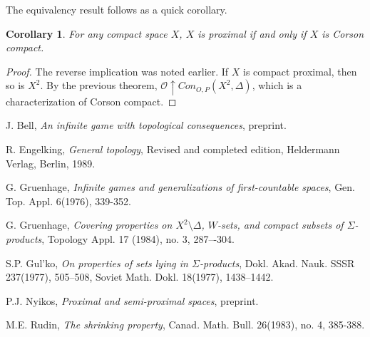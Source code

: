 \documentclass{amsart}
\newtheorem{cor}[thm]{Corollary}
\theoremstyle{definition}
\theoremstyle{remark}
\newcommand{\<}{\langle}
\renewcommand{\>}{\rangle}
\newcommand{\congame}[2]{Con_{O,P}(#1,#2)}
\newcommand{\pl}[1]{\mathscr{#1}}
\newcommand{\win}{\uparrow}
\begin{document}
The equivalency result follows as a quick corollary.

\begin{cor}
  For any compact space $X$, $X$ is proximal if and only if $X$ is Corson compact.
\end{cor}

\begin{proof}
  The reverse implication was noted earlier. If $X$ is compact proximal, then so is $X^2$. By the previous theorem, $\pl O\win\congame{X^2}{\Delta}$, which is a characterization of Corson compact.
\end{proof}




\begin{thebibliography}{99}
 J. Bell,
  \emph{An infinite game with topological consequences}, preprint.

  R. Engelking,
  \emph{General topology}, Revised and completed edition, Heldermann Verlag, Berlin, 1989.




 G. Gruenhage,
  \emph{Infinite games and generalizations of first-countable spaces}, Gen. Top. Appl. 6(1976), 339-352.

  G. Gruenhage,
  \emph{Covering properties on $X^2\setminus\Delta$, $W$-sets, and compact subsets of $\Sigma$-products},
  Topology Appl. 17 (1984), no. 3, 287–-304.


 S.P. Gul'ko, \emph{On properties of sets lying in $\Sigma$-products}, Dokl. Akad. Nauk. SSSR 237(1977), 505--508, Soviet Math. Dokl. 18(1977), 1438--1442.


  P.J. Nyikos,
  \emph{Proximal and semi-proximal spaces}, preprint.

 M.E. Rudin, \emph{The shrinking property}, Canad. Math. Bull. 26(1983), no. 4, 385-388.

\end{thebibliography}
\end{document}
